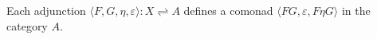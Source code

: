 Each adjunction $\langle F, G, \eta, \varepsilon \rangle: X \rightleftharpoons A$ defines a comonad $\langle FG, \varepsilon, F\eta G \rangle$ in the category $A$.

